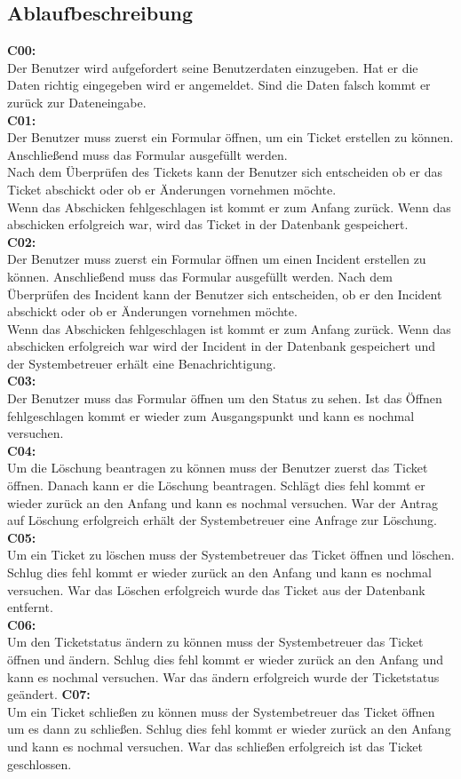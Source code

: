 \subsection{Ablaufbeschreibung}
\textbf{C00:}
\\ 
Der Benutzer wird aufgefordert seine Benutzerdaten einzugeben.
Hat er die Daten richtig eingegeben wird er angemeldet. Sind die Daten falsch kommt er zurück zur Dateneingabe.
\\
\textbf{C01:}
\\
Der Benutzer muss zuerst ein Formular öffnen, um ein Ticket erstellen zu können. Anschließend muss das Formular ausgefüllt werden. 
\\
Nach dem Überprüfen des Tickets kann der Benutzer sich entscheiden ob er das Ticket abschickt oder ob er Änderungen vornehmen möchte. 
\\
Wenn das Abschicken fehlgeschlagen ist kommt er zum Anfang zurück. Wenn das abschicken erfolgreich war, wird das Ticket in der Datenbank gespeichert.
\\
\textbf{C02:}
\\
Der Benutzer muss zuerst ein Formular öffnen um einen Incident erstellen zu können. Anschließend muss das Formular ausgefüllt werden. Nach dem Überprüfen des Incident kann der Benutzer sich entscheiden, ob er den Incident abschickt oder ob er Änderungen vornehmen möchte.
\\
Wenn das Abschicken fehlgeschlagen ist kommt er zum Anfang zurück. Wenn das abschicken erfolgreich war wird der Incident in der Datenbank gespeichert und der Systembetreuer erhält eine Benachrichtigung.
\\
\textbf{C03:}
\\
Der Benutzer muss das Formular öffnen um den Status zu sehen. Ist das Öffnen fehlgeschlagen kommt er wieder zum Ausgangspunkt und kann es nochmal versuchen.
\\
\textbf{C04:}
\\
Um die Löschung beantragen zu können muss der Benutzer zuerst das Ticket öffnen. Danach kann er die Löschung beantragen. Schlägt dies fehl kommt er wieder zurück an den Anfang und kann es nochmal versuchen. War der Antrag auf Löschung erfolgreich erhält der Systembetreuer eine Anfrage zur Löschung.
\\
\textbf{C05:}
\\
Um ein Ticket zu löschen muss der Systembetreuer das Ticket öffnen und löschen. Schlug dies fehl kommt er wieder zurück an den Anfang und kann es nochmal versuchen. War das Löschen erfolgreich wurde das Ticket aus der Datenbank entfernt.
\\
\textbf{C06:}
\\
Um den Ticketstatus ändern zu können muss der Systembetreuer das Ticket öffnen und ändern. Schlug dies fehl kommt er wieder zurück an den Anfang und kann es nochmal versuchen. War das ändern erfolgreich wurde der Ticketstatus geändert.
\newpage
\textbf{C07:}
\\
Um ein Ticket schließen zu können muss der Systembetreuer das Ticket öffnen um es dann zu schließen. Schlug dies fehl kommt er wieder zurück an den Anfang und kann es nochmal versuchen. War das schließen erfolgreich ist das Ticket geschlossen.

